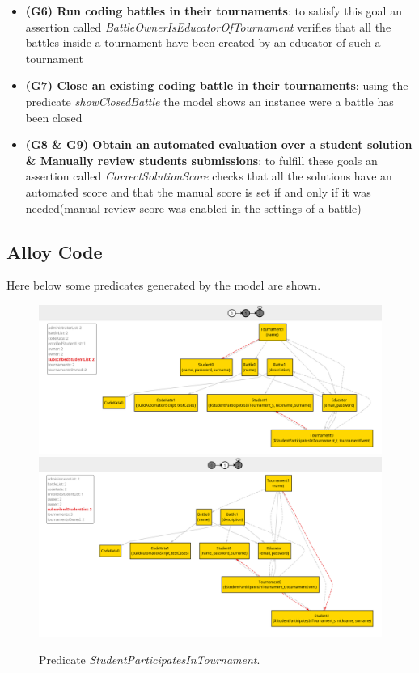 \documentclass[../RASD.tex]{subfiles}
\begin{document}
\begin{itemize}
    \item {\textbf{(G6) Run coding battles in their tournaments}: to satisfy this goal an assertion called \textit{BattleOwnerIsEducatorOfTournament} verifies that all the battles inside a tournament have been created by an educator of such a tournament}
    \item {\textbf{(G7) Close an existing coding battle in their tournaments}: using the predicate \textit{showClosedBattle} the model shows an instance were a battle has been closed}
    \item {\textbf{(G8 \& G9) Obtain an automated evaluation over a student solution \& Manually review students submissions}: to fulfill these goals an assertion called \textit{CorrectSolutionScore} checks that all the solutions have an automated score and that the manual score is set if and only if it was needed(manual review score was enabled in the settings of a battle)}
\end{itemize}

\newpage

\subsection{Alloy Code}\label{subsec:alloy_code}
    

\newpage

Here below some predicates generated by the model are shown.
\begin{figure}[h!]
    \centering
    \includegraphics[width=\textwidth]{../assets/section_4/StudentParticipatesInTournament_0.png}
    \includegraphics[width=\textwidth]{../assets/section_4/StudentParticipatesInTournament_1.png}
    \caption{Predicate \textit{StudentParticipatesInTournament}.}
    \label{img:alloy_student_participates_in_tournament}
\end{figure}
\end{document}
